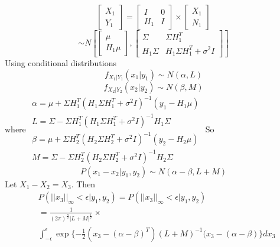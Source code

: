 \documentclass{article}
\begin{document}
\begin{equation}
 \left[\begin{array}{c} X_1 \\ Y_1 \end{array}\right] = 
\begin{bmatrix} I & 0 \\ H_1 & I \end{bmatrix} \times \left[ \begin{array}{c} X_1 \\ N_1 \end{array} \right]      
\end{equation}
\begin{equation}
 \sim N \left[\begin{bmatrix} \mu \\ H_1 \mu \end{bmatrix}, \begin{bmatrix} \Sigma & \Sigma H_1^T \\ H_1 \Sigma & H_1 \Sigma H_1^T + \sigma^2 I \end{bmatrix} \right]
\end{equation}
\noindent
Using conditional distributions
 \begin{equation}
  f_{X_1|Y_1}(x_1|y_1) \sim N(\alpha, L)
 \end{equation}
\begin{equation}
  f_{X_2|Y_2}(x_2|y_2) \sim N(\beta, M)
 \end{equation}
where 
\small{
$\begin{array}{l}\alpha = \mu + \Sigma H_1^T (H_1 \Sigma H_1^T + \sigma^2 I)^{-1} (y_1 - H_1 \mu) \\ L = \Sigma - \Sigma H_1^T (H_1 \Sigma H_1^T + \sigma^2 I)^{-1} H_1 \Sigma \\ \beta = \mu + \Sigma H_2^T (H_2 \Sigma H_2^T + \sigma^2 I)^{-1} (y_2 - H_2 \mu) \\ M = \Sigma - \Sigma H_2^T (H_2 \Sigma H_2^T + \sigma^2 I)^{-1} H_2 \Sigma        \end{array}$}        
So
\begin{equation}
P(x_1 - x_2|y_1, y_2) \sim N(\alpha-\beta, L+M)
\end{equation}
Let $X_1 - X_2 = X_3$. Then
\small{
\begin{align}
&P(||x_3||_{\infty} < \epsilon|y_1,y_2)   \nonumber
										 =	 P(||x_3||_{\infty} < \epsilon|y_1,y_2)\\ \nonumber
										 &=   \frac{1}{(2 \pi)^{\frac{n}{2}} |L+M|^ \frac{1}{2}} \times \\ 
										 & \int_{-\epsilon }^{\epsilon}\exp \{ -\frac{1}{2}(x_3 - (\alpha -\beta)^T)(L+M)^{-1}(x_3 - (\alpha -\beta)\}dx_3 
\end{align}}
\end{document}
